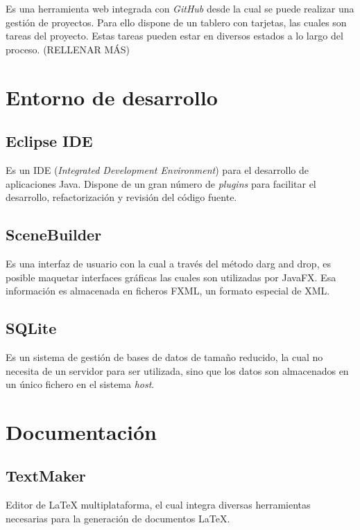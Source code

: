 Es una herramienta web integrada con \emph{GitHub} desde la cual se puede realizar una gestión de proyectos. Para ello dispone de un tablero con tarjetas, las cuales son tareas del proyecto. Estas tareas pueden estar en diversos estados a lo largo del proceso. (RELLENAR MÁS)

\section{Entorno de desarrollo}\label{entorno_de_desarrollo}

\subsection{Eclipse IDE}\label{eclipse_ide}

Es un IDE (\emph{Integrated Development Environment}) para el desarrollo de aplicaciones Java. Dispone de un gran número de \emph{plugins} para facilitar el desarrollo, refactorización y revisión del código fuente.

\subsection{SceneBuilder}\label{scenebuilder}

Es una interfaz de usuario con la cual a través del método darg and drop, es posible maquetar interfaces gráficas las cuales son utilizadas por JavaFX. Esa información es almacenada en ficheros FXML, un formato especial de XML.

\subsection{SQLite}\label{sqlite}

Es un sistema de gestión de bases de datos de tamaño reducido, la cual no necesita de un servidor para ser utilizada, sino que los datos son almacenados en un único fichero en el sistema \emph{host}.

\section{Documentación}\label{documentacion}

\subsection{TextMaker}\label{textmaker}

Editor de LaTeX multiplataforma, el cual integra diversas herramientas necesarias para la generación de documentos LaTeX.


